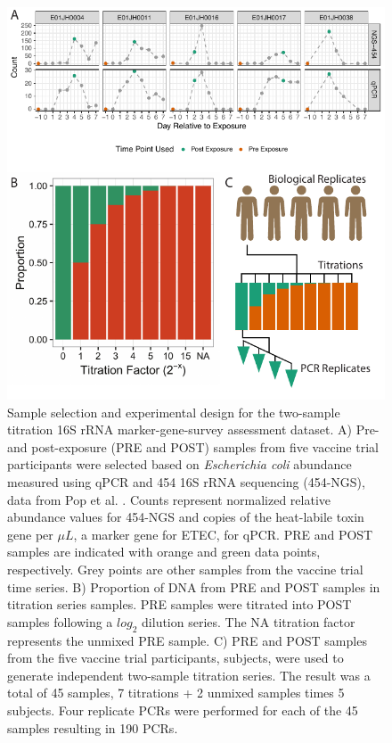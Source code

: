 \documentclass{bmcart}
\begin{document}
\begin{figure}
\centering
\includegraphics{experimentalDesign.pdf}
\caption{\label{fig:countExperimentalDesign}Sample selection and
experimental design for the two-sample titration 16S rRNA
marker-gene-survey assessment dataset. A) Pre- and post-exposure (PRE
and POST) samples from five vaccine trial participants were selected
based on \textit{Escherichia coli} abundance measured using qPCR and 454
16S rRNA sequencing (454-NGS), data from Pop et al. \cite{pop2016individual}.
Counts represent normalized relative abundance values for 454-NGS and
copies of the heat-labile toxin gene per \(\mu L\), a marker gene for
ETEC, for qPCR. PRE and POST samples are indicated with orange and green
data points, respectively. Grey points are other samples from the
vaccine trial time series. B) Proportion of DNA from PRE and POST
samples in titration series samples. PRE samples were titrated into POST
samples following a \(log_2\) dilution series. The NA titration factor
represents the unmixed PRE sample. C) PRE and POST samples from the five
vaccine trial participants, subjects, were used to generate independent
two-sample titration series. The result was a total of 45 samples, 7
titrations + 2 unmixed samples times 5 subjects. Four replicate PCRs
were performed for each of the 45 samples resulting in 190 PCRs.}
\end{figure}
\end{document}
